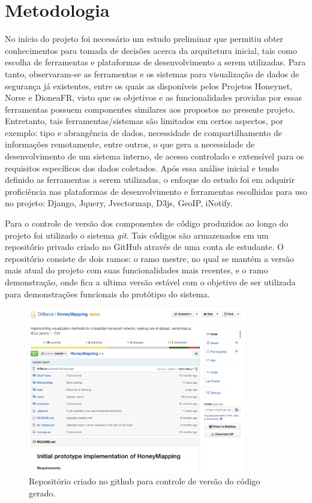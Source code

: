 \documentclass[Portuguese]
{ic-tese-v2}
\begin{document}
\chapter{Metodologia}
No início do projeto foi necessário um estudo preliminar que permitiu obter conhecimentos para tomada de decisões acerca da arquitetura inicial, tais como escolha de ferramentas e plataformas de desenvolvimento a serem utilizadas.
Para tanto, observaram-se as ferramentas e os sistemas para visualização de dados de segurança já existentes, entre os quais as disponíveis pelos Projetos Honeynet\cite{honeynet}, Norse\cite{ipviking} e DioneaFR\cite{dioneaefr}, visto que os objetivos e as funcionalidades providas por essas ferramentas possuem componentes similares aos propostos no presente projeto. Entretanto, tais ferramentas/sistemas são limitados em certos aspectos, por exemplo: tipo e abrangência de dados, necessidade de compartilhamento de informações remotamente, entre outros, o que gera a necessidade de desenvolvimento de um sistema interno, de acesso controlado e extensível para os requisitos específicos dos dados coletados.
Após essa análise inicial e tendo definido as ferramentas a serem utilizadas, o enfoque do estudo foi em adquirir proficiência nas plataformas de desenvolvimento e ferramentas escolhidas para uso no projeto: Django, Jquery, Jvectormap, D3js, GeoIP, iNotify.

Para o controle de versão dos componentes de có́digo produzidos ao longo do projeto foi utilizado o sistema \emph{git}. Tais có́digos são armazenados em um repositó́rio privado criado no GitHub através de uma conta de estudante. O repositó́rio consiste de dois ramos: o ramo mestre, no qual se mantém a versão mais atual do projeto com suas funcionalidades mais recentes, e o ramo demonstração, onde fica a ultima versão estável com o objetivo de ser utilizada para demonstrações funcionais do protótipo do sistema.

\begin{figure}
\center
\includegraphics[width=0.85\textwidth]{figs/git.png}
\caption{Repositório criado no github para controle de versão do código gerado.}
\label{mapa}
\end{figure}
\end{document}
